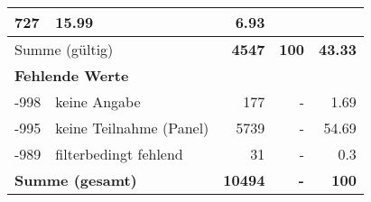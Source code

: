 \begin{longtable}{lXrrr}
       \num{727} &
       \num[round-mode=places,round-precision=2]{15.99} &
         \num[round-mode=places,round-precision=2]{6.93} \\
     \midrule
     \multicolumn{2}{l}{Summe (gültig)} &
       \textbf{\num{4547}} &
     \textbf{\num{100}} &
       \textbf{\num[round-mode=places,round-precision=2]{43.33}} \\
     \multicolumn{5}{l}{\textbf{Fehlende Werte}}\\
       -998 &
       keine Angabe &
         \num{177} &
        - &
         \num[round-mode=places,round-precision=2]{1.69} \\
       -995 &
       keine Teilnahme (Panel) &
         \num{5739} &
        - &
         \num[round-mode=places,round-precision=2]{54.69} \\
       -989 &
       filterbedingt fehlend &
         \num{31} &
        - &
         \num[round-mode=places,round-precision=2]{0.3} \\
     \midrule
     \multicolumn{2}{l}{\textbf{Summe (gesamt)}} &
          \textbf{\num{10494}} &
        \textbf{-} &
        \textbf{\num{100}} \\
     \bottomrule
     \end{longtable}
     
